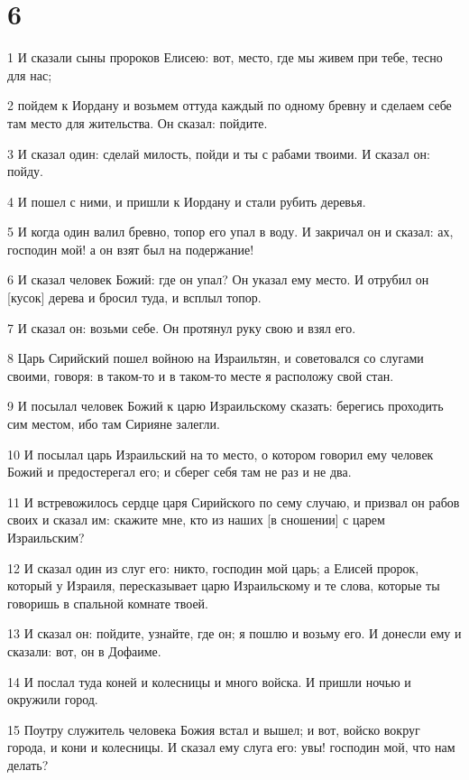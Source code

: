 \chapter{6}

\par 1 И сказали сыны пророков Елисею: вот, место, где мы живем при тебе, тесно для нас;
\par 2 пойдем к Иордану и возьмем оттуда каждый по одному бревну и сделаем себе там место для жительства. Он сказал: пойдите.
\par 3 И сказал один: сделай милость, пойди и ты с рабами твоими. И сказал он: пойду.
\par 4 И пошел с ними, и пришли к Иордану и стали рубить деревья.
\par 5 И когда один валил бревно, топор его упал в воду. И закричал он и сказал: ах, господин мой! а он взят был на подержание!
\par 6 И сказал человек Божий: где он упал? Он указал ему место. И отрубил он [кусок] дерева и бросил туда, и всплыл топор.
\par 7 И сказал он: возьми себе. Он протянул руку свою и взял его.
\par 8 Царь Сирийский пошел войною на Израильтян, и советовался со слугами своими, говоря: в таком-то и в таком-то месте я расположу свой стан.
\par 9 И посылал человек Божий к царю Израильскому сказать: берегись проходить сим местом, ибо там Сирияне залегли.
\par 10 И посылал царь Израильский на то место, о котором говорил ему человек Божий и предостерегал его; и сберег себя там не раз и не два.
\par 11 И встревожилось сердце царя Сирийского по сему случаю, и призвал он рабов своих и сказал им: скажите мне, кто из наших [в сношении] с царем Израильским?
\par 12 И сказал один из слуг его: никто, господин мой царь; а Елисей пророк, который у Израиля, пересказывает царю Израильскому и те слова, которые ты говоришь в спальной комнате твоей.
\par 13 И сказал он: пойдите, узнайте, где он; я пошлю и возьму его. И донесли ему и сказали: вот, он в Дофаиме.
\par 14 И послал туда коней и колесницы и много войска. И пришли ночью и окружили город.
\par 15 Поутру служитель человека Божия встал и вышел; и вот, войско вокруг города, и кони и колесницы. И сказал ему слуга его: увы! господин мой, что нам делать?

